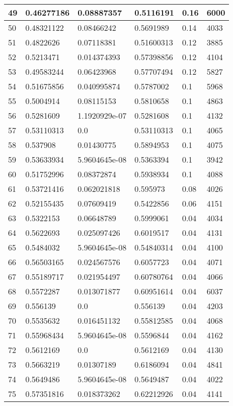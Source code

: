 \begin{longtable}{|l|l|l|l|l|l|}
49 & 0.46277186 & 0.08887357 & 0.5116191 & 0.16 & 6000 \\ \hline 
50 & 0.48321122 & 0.08466242 & 0.5691989 & 0.14 & 4033 \\ \hline 
51 & 0.4822626 & 0.07118381 & 0.51600313 & 0.12 & 3885 \\ \hline 
52 & 0.5213471 & 0.014374393 & 0.57398856 & 0.12 & 4104 \\ \hline 
53 & 0.49583244 & 0.06423968 & 0.57707494 & 0.12 & 5827 \\ \hline 
54 & 0.51675856 & 0.040995874 & 0.5787002 & 0.1 & 5968 \\ \hline 
55 & 0.5004914 & 0.08115153 & 0.5810658 & 0.1 & 4863 \\ \hline 
56 & 0.5281609 & 1.1920929e-07 & 0.5281608 & 0.1 & 4132 \\ \hline 
57 & 0.53110313 & 0.0 & 0.53110313 & 0.1 & 4065 \\ \hline 
58 & 0.537908 & 0.01430775 & 0.5894953 & 0.1 & 4075 \\ \hline 
59 & 0.53633934 & 5.9604645e-08 & 0.5363394 & 0.1 & 3942 \\ \hline 
60 & 0.51752996 & 0.08372874 & 0.5938934 & 0.1 & 4088 \\ \hline 
61 & 0.53721416 & 0.062021818 & 0.595973 & 0.08 & 4026 \\ \hline 
62 & 0.52155435 & 0.07609419 & 0.5422856 & 0.06 & 4151 \\ \hline 
63 & 0.5322153 & 0.06648789 & 0.5999061 & 0.04 & 4034 \\ \hline 
64 & 0.5622693 & 0.025097426 & 0.6019517 & 0.04 & 4131 \\ \hline 
65 & 0.5484032 & 5.9604645e-08 & 0.54840314 & 0.04 & 4100 \\ \hline 
66 & 0.56503165 & 0.024567576 & 0.6057723 & 0.04 & 4071 \\ \hline 
67 & 0.55189717 & 0.021954497 & 0.60780764 & 0.04 & 4066 \\ \hline 
68 & 0.5572287 & 0.013071877 & 0.60951614 & 0.04 & 6037 \\ \hline 
69 & 0.556139 & 0.0 & 0.556139 & 0.04 & 4203 \\ \hline 
70 & 0.5535632 & 0.016451132 & 0.55812585 & 0.04 & 4068 \\ \hline 
71 & 0.55968434 & 5.9604645e-08 & 0.5596844 & 0.04 & 4162 \\ \hline 
72 & 0.5612169 & 0.0 & 0.5612169 & 0.04 & 4130 \\ \hline 
73 & 0.5663219 & 0.01307189 & 0.6186094 & 0.04 & 4841 \\ \hline 
74 & 0.5649486 & 5.9604645e-08 & 0.5649487 & 0.04 & 4022 \\ \hline 
75 & 0.57351816 & 0.018373262 & 0.62212926 & 0.04 & 4141 \\ \hline 
\end{longtable}
